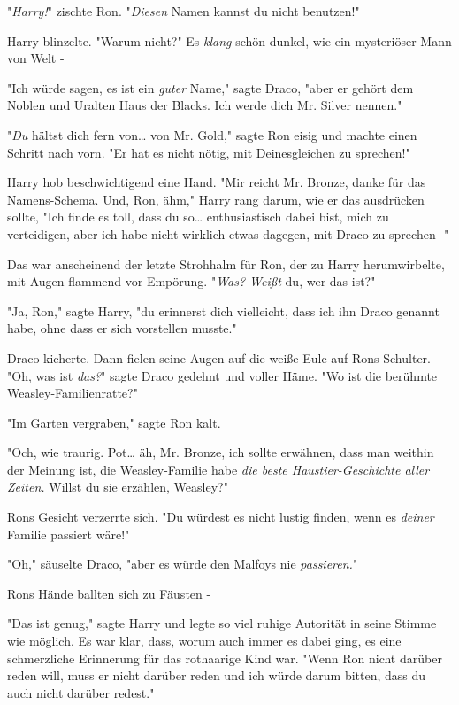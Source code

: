 {"\emph{Harry!}" zischte Ron. "\emph{Diesen} Namen kannst du nicht benutzen!"

Harry blinzelte. "Warum nicht?" Es \emph{klang} schön dunkel, wie ein mysteriöser Mann von Welt -

"Ich würde sagen, es ist ein \emph{guter} Name," sagte Draco, "aber er gehört dem Noblen und Uralten Haus der Blacks. Ich werde dich Mr. Silver nennen."

"\emph{Du} hältst dich fern von… von Mr. Gold," sagte Ron eisig und machte einen Schritt nach vorn. "Er hat es nicht nötig, mit Deinesgleichen zu sprechen!"

Harry hob beschwichtigend eine Hand. "Mir reicht Mr. Bronze, danke für das Namens-Schema. Und, Ron, ähm," Harry rang darum, wie er das ausdrücken sollte, "Ich finde es toll, dass du so… enthusiastisch dabei bist, mich zu verteidigen, aber ich habe nicht wirklich etwas dagegen, mit Draco zu sprechen -"

Das war anscheinend der letzte Strohhalm für Ron, der zu Harry herumwirbelte, mit Augen flammend vor Empörung. "\emph{Was? Weißt} du, wer das ist?"

"Ja, Ron," sagte Harry, "du erinnerst dich vielleicht, dass ich ihn Draco genannt habe, ohne dass er sich vorstellen musste."

Draco kicherte. Dann fielen seine Augen auf die weiße Eule auf Rons Schulter. "Oh, was ist \emph{das?}" sagte Draco gedehnt und voller Häme. "Wo ist die berühmte Weasley-Familienratte?"

"Im Garten vergraben," sagte Ron kalt.

"Och, wie traurig. Pot… äh, Mr. Bronze, ich sollte erwähnen, dass man weithin der Meinung ist, die Weasley-Familie habe \emph{die beste Haustier-Geschichte aller Zeiten.} Willst du sie erzählen, Weasley?"

Rons Gesicht verzerrte sich. "Du würdest es nicht lustig finden, wenn es \emph{deiner} Familie passiert wäre!"

"Oh," säuselte Draco, "aber es würde den Malfoys nie \emph{passieren.}"

Rons Hände ballten sich zu Fäusten -

"Das ist genug," sagte Harry und legte so viel ruhige Autorität in seine Stimme wie möglich. Es war klar, dass, worum auch immer es dabei ging, es eine schmerzliche Erinnerung für das rothaarige Kind war. "Wenn Ron nicht darüber reden will, muss er nicht darüber reden und ich würde darum bitten, dass du auch nicht darüber redest."

}
